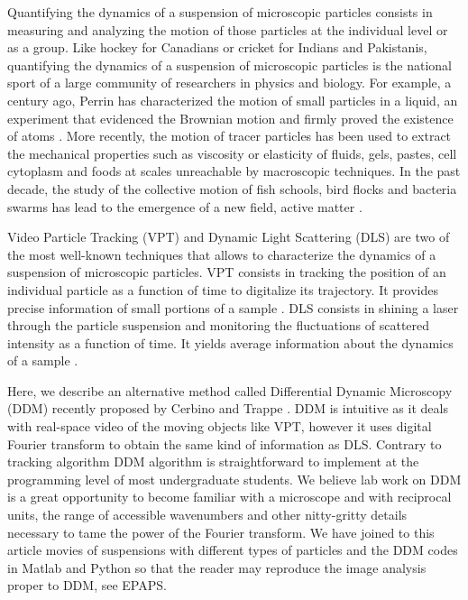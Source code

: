 \documentclass[%
 aip,
 jmp,%
 amsmath,amssymb,
reprint,%
]{revtex4-1}
\begin{document}
Quantifying the dynamics of a suspension of microscopic particles consists in measuring and analyzing the motion of those particles at the individual level or as a group. Like hockey for Canadians or cricket for Indians and Pakistanis, quantifying the dynamics of a suspension of microscopic particles is the national sport of a large community of researchers in physics and biology. For example, a century ago, Perrin has characterized the motion of small particles in a liquid, an experiment that evidenced the Brownian motion and firmly proved the existence of atoms \cite{22_perrin2014atomes}. More recently, the motion of tracer particles has been used to extract the mechanical properties such as viscosity or elasticity of fluids, gels\cite{Mason1997, Chen2010}, pastes, cell cytoplasm\cite{Fabry2001,Lau2003} and foods at scales unreachable by macroscopic techniques. In the past decade, the study of the collective motion of fish schools, bird flocks and bacteria swarms has lead to the emergence of a new field, active matter \cite{Bricard2013}.

Video Particle Tracking (VPT) and Dynamic Light Scattering (DLS) are two of the most well-known techniques that allows to characterize the dynamics of a suspension of microscopic particles. VPT consists in tracking the position of an individual particle as a function of time to digitalize its trajectory. It provides precise information of small portions of a sample \citep{Crocker1996}. DLS consists in shining a laser through the particle suspension and monitoring the fluctuations of scattered intensity as a function of time. It yields average information about the dynamics of a sample \citep{18_sartor2003dynamic}.

Here, we describe an alternative method called Differential Dynamic Microscopy (DDM) recently proposed by Cerbino and Trappe \cite{2_DDM}. DDM is intuitive as it deals with real-space video of the moving objects like VPT, however it uses digital Fourier transform to obtain the same kind of information as DLS.  Contrary to tracking algorithm DDM algorithm is straightforward to implement at the programming level of most undergraduate students. We believe lab work on DDM is a great opportunity to become familiar with a microscope and with reciprocal units, the range of accessible wavenumbers and other nitty-gritty details necessary to tame the power of the Fourier transform. We have joined to this article movies of suspensions with different types of particles and the DDM codes in Matlab and Python so that the reader may reproduce the image analysis proper to DDM, see EPAPS.
\end{document}
